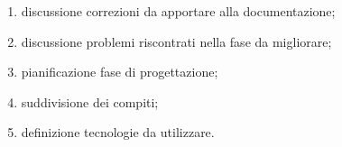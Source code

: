 \begin{enumerate}
    \item discussione correzioni da apportare alla documentazione;
    \item discussione problemi riscontrati nella fase da migliorare;
    \item pianificazione fase di progettazione;
    \item suddivisione dei compiti;
    \item definizione tecnologie da utilizzare.
\end{enumerate}